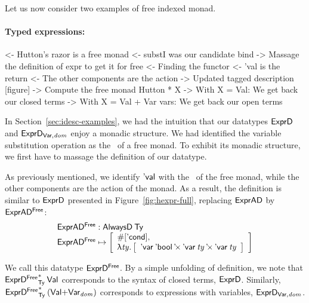 Let us now consider two examples of free indexed monad.


\paragraph{Typed expressions:}

\begin{wstructure}
<- Hutton's razor is a free monad
    <- substI was our candidate bind
        -> Massage the definition of expr to get it for free
    <- Finding the functor
        <- 'val is the return
        <- The other components are the action
        -> Updated tagged description [figure]
    -> Compute the free monad Hutton * X
        -> With X = Val: We get back our closed terms
        -> With X = Val + Var vars: We get back our open terms
\end{wstructure}

In Section~\ref{sec:idesc-examples}, we had the intuition that our
datatypes $\HExprD$ and $\HExprVarD{\V{dom}}$ enjoy a monadic
structure. We had identified the variable substitution operation as
the \bind\ of a free monad. To exhibit its monadic structure, we first
have to massage the definition of our datatype.

As previously mentioned, we identify $\SYMBEval$ with the \return\ of
the free monad, while the other components are the action of the
monad. As a result, the definition is similar to $\HExprD$ presented
in Figure~\ref{fig:hexpr-full}, replacing $\HExprAD$ by
$\HExprAFreeD$:
%
\[\stk{
\HExprAFreeD : \ATagIDesc{\Ty} \\
\HExprAFreeD \mapsto \bigRedBracket{
                 \begin{array}{l}
                   \EnumT{\sqr{\SYMBEcond}} \red{,} \\
                   \LAM{\V{ty}}
                   \bigRedBracket{
                   \begin{array}{l}
                   \DProd{\DVar{\Ebool}}{\DProd{\DVar{\V{ty}}}{\DVar{\V{ty}}}}
                   \end{array}
                   }
                 \end{array}
                 }
}\]

We call this datatype $\HExprFreeD$. By a simple unfolding of
definition, we note that $\FreeIMonad{\HExprFreeD}{\Ty}{\SYMBVal}$
corresponds to the syntax of closed terms, $\HExprD$. Similarly,
$\FreeIMonad{\HExprFreeD}{\Ty}{(\SUM{\SYMBVal}{\Var{\V{dom}}{}})}$
corresponds to expressions with variables, $\HExprVarD{\V{dom}}$.

